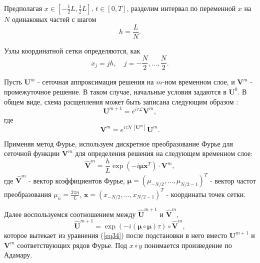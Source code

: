 \documentclass[12pt,a4paper]{article}
\begin{document}
	Предполагая \( x \in [-\frac{1}{2} L, \frac{1}{2} L]\), \( t \in [0, T]\), разделим интервал по переменной \(x\) на \(N\) одинаковых частей с шагом
	\begin{equation}
		h=\frac{L}{N}.
	\end{equation}

	Узлы координатной сетки определяются, как
	\begin{equation}
		x_{j}=jh, \quad j= -\frac{N}{2}, \ldots , \frac{N}{2}.
	\end{equation}

	Пусть \(\boldsymbol{U}^{m}\) - сеточная аппроксимация решения на \(m\)-ном временном слое, и \(\boldsymbol{V}^{m}\) - промежуточное решение. В таком случае, начальные условия задаются в \(\boldsymbol{U}^{0}\). В общем виде, схема расщепления может быть записана следующим образом \cite{Rad1}:
	\begin{equation}\label{eq34}
		\boldsymbol{U}^{m+1}=e^{i\tau\mathscr{L}}\boldsymbol{V}^m,
	\end{equation}
	где
	\begin{equation}\label{eq33}
		\boldsymbol{V}^m=e^{i\tau\mathscr{N}[\boldsymbol{U}^m]}\boldsymbol{U}^m.
	\end{equation}

	Применяя метод Фурье, используем дискретное преобразование Фурье для сеточной функции \(\boldsymbol{V}^m\) для определения решения на следующем временном слое:
	\begin{equation} 
		\hat{\boldsymbol{V}}^m=\frac{h}{L}\exp\left(-i \boldsymbol{\mu} \boldsymbol{x}^{T}\right)\cdot \boldsymbol{V}^{m},
	\end{equation}
	где \(\hat{\boldsymbol{V}}^m\) - вектор коэффициентов Фурье, \(\boldsymbol{\mu}=\left(\mu_{-N/2},\ldots,\mu_{N/2-1}\right)^{T}\) - вектор частот преобразования \(\mu_{n}=\frac{2\pi n}{L}\), \(\boldsymbol{x}=\left(x_{-N/2},\ldots,x_{N/2-1}\right)^{T}\) - координаты точек сетки.

	Далее воспользуемся соотношением между \(\hat{\boldsymbol{U}}^{m+1}\) и \(\hat{\boldsymbol{V}}^{m}\),
	\begin{equation} \label{eq46}
		\hat{\boldsymbol{U}}^{m+1}=\exp\left(-i \left(\boldsymbol{\mu}\circ \boldsymbol{\mu}\right) \tau\right)\circ \hat{\boldsymbol{V}}^{m},
	\end{equation}
	которое вытекает из уравнения (\ref{eq34}) после подстановки в него вместо \(\boldsymbol{U}^{m+1}\) и \(\boldsymbol{V}^{m}\) соответствующих рядов Фурье. Под \(x\circ y\) понимается произведение по Адамару.
\end{document}
